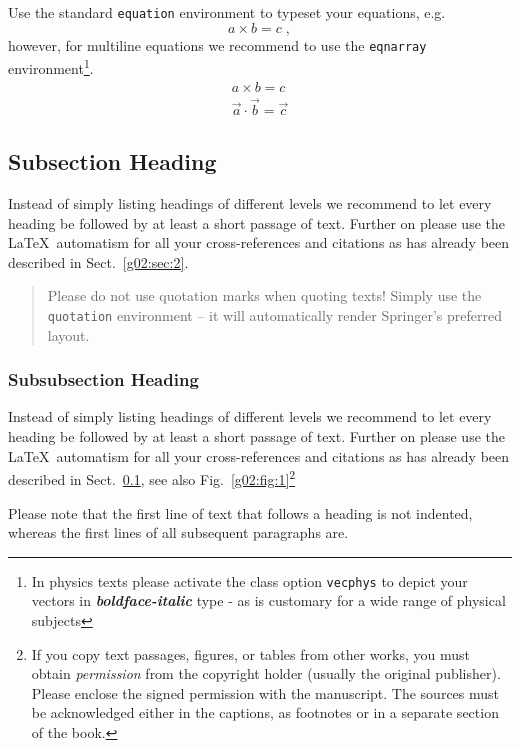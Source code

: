 Use the standard \verb|equation| environment to typeset your equations, e.g.
%
\begin{equation}
a \times b = c\;,
\end{equation}
%
however, for multiline equations we recommend to use the \verb|eqnarray|
environment\footnote{In physics texts please activate the class option
\texttt{vecphys} to depict your vectors in \textbf{\itshape
boldface-italic} type - as is customary for a wide range of physical
subjects}.
\begin{eqnarray}
a \times b = c \nonumber\\
\vec{a} \cdot \vec{b}=\vec{c}
\label{g02:eq:01}
\end{eqnarray}

\subsection{Subsection Heading}
\label{g02:subsec:2}
Instead of simply listing headings of different levels we recommend to let every heading be followed by at least a short passage of text. Further on please use the \LaTeX\ automatism for all your cross-references and citations as has already been described in Sect.~\ref{g02:sec:2}.

\begin{quotation}
Please do not use quotation marks when quoting texts! Simply use the \verb|quotation| environment -- it will automatically render Springer's preferred layout.
\end{quotation}


\subsubsection{Subsubsection Heading}
Instead of simply listing headings of different levels we recommend to let every heading be followed by at least a short passage of text. Further on please use the \LaTeX\ automatism for all your cross-references and citations as has already been described in Sect.~\ref{g02:subsec:2}, see also Fig.~\ref{g02:fig:1}\footnote{If you copy text passages, figures, or tables from other works, you must obtain \textit{permission} from the copyright holder (usually the original publisher). Please enclose the signed permission with the manuscript. The sources must be acknowledged either in the captions, as footnotes or in a separate section of the book.}

Please note that the first line of text that follows a heading is not indented, whereas the first lines of all subsequent paragraphs are.

